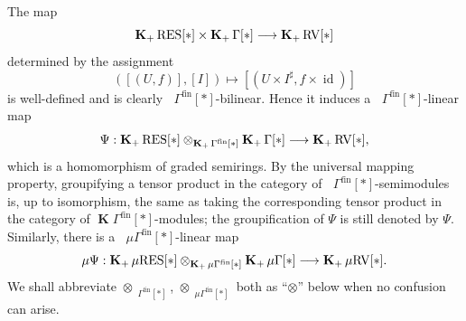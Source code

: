 \documentclass[12pt]{amsart}
\theoremstyle{plain}
\theoremstyle{definition}
\theoremstyle{remark}
\numberwithin{equation}{section}
\theoremstyle{plain}
\newcommand{\RV}{\textup{RV}}
\DeclareMathOperator{\id}{id}
\newcommand{\0}{\emptyset}
\newcommand{\fun}{\longrightarrow}
\newcommand{\efun}{\longmapsto}
\newcommand{\mgRV}{{\mu}{\RV}}
\newcommand{\mG}{{\mu}{\Gamma}}
\newcommand{\RES}{\textup{RES}}
\newcommand{\mgRES}{{\mu}{\RES}}
\DeclareMathOperator{\gsk}{\mathbf{K}_+}
\DeclareMathOperator{\ggk}{\mathbf{K}}
\DeclareMathOperator{\fin}{fin}
\begin{document}
The map
\[
\gsk \RES[*] \times \gsk \Gamma[*] \fun \gsk \RV[*]
\]
determined by the assignment
\begin{equation}\label{bil:def}
([(U, f)], [I]) \efun [(U \times I^\sharp, f \times \id)]
\end{equation}
is well-defined and is clearly $\gsk \Gamma^{\fin}[*]$-bilinear. Hence it induces a $\gsk \Gamma^{\fin}[*]$-linear map
\begin{equation}\label{tensor:expre}
\Psi: \gsk \RES[*] \otimes_{\gsk \Gamma^{\fin}[*]} \gsk \Gamma[*] \fun \gsk \RV[*],
\end{equation}
which is a homomorphism of graded semirings. By the universal mapping property, groupifying a tensor product in the category of $\gsk \Gamma^{\fin}[*]$-semimodules is, up to isomorphism, the same as taking the corresponding tensor product in the category of $\ggk \Gamma^{\fin}[*]$-modules; the groupification of $\Psi$ is still denoted by $\Psi$. Similarly, there is a
$\gsk \mG^{\fin}[*]$-linear map
\begin{equation}\label{bdd:to:2bdd}
{\mu}\Psi: \gsk \mgRES[*] \otimes_{\gsk \mG^{\fin}[*]} \gsk \mG[*] \fun \gsk \mgRV[*].
\end{equation}
We shall abbreviate $\otimes_{\gsk \Gamma^{\fin}[*]}$, $\otimes_{\gsk \mG^{\fin}[*]}$ both as ``$\otimes$'' below when no confusion can arise.
\end{document}
